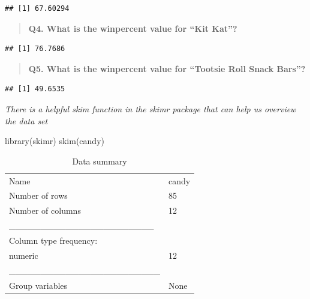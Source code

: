 \documentclass[
]{article}
\newenvironment{Shaded}{\begin{snugshade}}{\end{snugshade}}
\newcommand{\FunctionTok}[1]{\textcolor[rgb]{0.00,0.00,0.00}{#1}}
\newcommand{\NormalTok}[1]{#1}
\newcommand{\SpecialCharTok}[1]{\textcolor[rgb]{0.00,0.00,0.00}{#1}}
\newcommand{\StringTok}[1]{\textcolor[rgb]{0.31,0.60,0.02}{#1}}
\begin{document}
\begin{verbatim}
## [1] 67.60294
\end{verbatim}

\begin{quote}
\textbf{Q4. What is the winpercent value for ``Kit Kat''?}
\end{quote}

\begin{Shaded}
\end{Shaded}

\begin{verbatim}
## [1] 76.7686
\end{verbatim}

\begin{quote}
\textbf{Q5. What is the winpercent value for ``Tootsie Roll Snack
Bars''?}
\end{quote}

\begin{Shaded}
\end{Shaded}

\begin{verbatim}
## [1] 49.6535
\end{verbatim}

\emph{There is a helpful skim function in the skimr package that can
help us overview the data set}

\begin{Shaded}
\begin{Highlighting}[]
\FunctionTok{library}\NormalTok{(skimr)}
\FunctionTok{skim}\NormalTok{(candy)}
\end{Highlighting}
\end{Shaded}

\begin{longtable}[]{@{}ll@{}}
\caption{Data summary}\tabularnewline
\toprule
\endhead
Name & candy \\
Number of rows & 85 \\
Number of columns & 12 \\
\_\_\_\_\_\_\_\_\_\_\_\_\_\_\_\_\_\_\_\_\_\_\_ & \\
Column type frequency: & \\
numeric & 12 \\
\_\_\_\_\_\_\_\_\_\_\_\_\_\_\_\_\_\_\_\_\_\_\_\_ & \\
Group variables & None \\
\bottomrule
\end{longtable}
\end{document}
